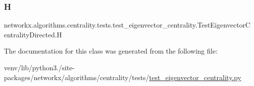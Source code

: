 \subsubsection{\texorpdfstring{H}{H}}
{\footnotesize\ttfamily networkx.\+algorithms.\+centrality.\+tests.\+test\+\_\+eigenvector\+\_\+centrality.\+Test\+Eigenvector\+Centrality\+Directed.\+H}



The documentation for this class was generated from the following file\+:\begin{DoxyCompactItemize}
\item 
venv/lib/python3./site-\/packages/networkx/algorithms/centrality/tests/\hyperlink{test__eigenvector__centrality_8py}{test\+\_\+eigenvector\+\_\+centrality.\+py}\end{DoxyCompactItemize}
